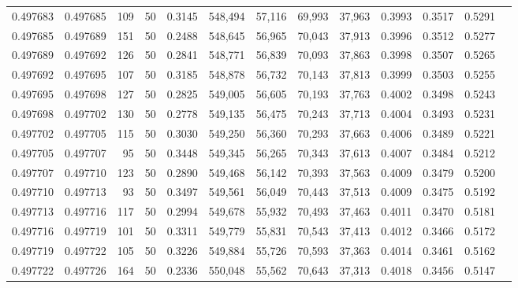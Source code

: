 \begin{tabular}{rrrrrrrrrrrrr}
0.497683 & 0.497685 &   109 &  50 &                                     0.3145 & 548,494 &  57,116 &  69,993 &  37,963 & 0.3993 & 0.3517 & 0.5291 \\
0.497685 & 0.497689 &   151 &  50 &                                     0.2488 & 548,645 &  56,965 &  70,043 &  37,913 & 0.3996 & 0.3512 & 0.5277 \\
0.497689 & 0.497692 &   126 &  50 &                                     0.2841 & 548,771 &  56,839 &  70,093 &  37,863 & 0.3998 & 0.3507 & 0.5265 \\
0.497692 & 0.497695 &   107 &  50 &                                     0.3185 & 548,878 &  56,732 &  70,143 &  37,813 & 0.3999 & 0.3503 & 0.5255 \\
0.497695 & 0.497698 &   127 &  50 &                                     0.2825 & 549,005 &  56,605 &  70,193 &  37,763 & 0.4002 & 0.3498 & 0.5243 \\
0.497698 & 0.497702 &   130 &  50 &                                     0.2778 & 549,135 &  56,475 &  70,243 &  37,713 & 0.4004 & 0.3493 & 0.5231 \\
0.497702 & 0.497705 &   115 &  50 &                                     0.3030 & 549,250 &  56,360 &  70,293 &  37,663 & 0.4006 & 0.3489 & 0.5221 \\
0.497705 & 0.497707 &    95 &  50 &                                     0.3448 & 549,345 &  56,265 &  70,343 &  37,613 & 0.4007 & 0.3484 & 0.5212 \\
0.497707 & 0.497710 &   123 &  50 &                                     0.2890 & 549,468 &  56,142 &  70,393 &  37,563 & 0.4009 & 0.3479 & 0.5200 \\
0.497710 & 0.497713 &    93 &  50 &                                     0.3497 & 549,561 &  56,049 &  70,443 &  37,513 & 0.4009 & 0.3475 & 0.5192 \\
0.497713 & 0.497716 &   117 &  50 &                                     0.2994 & 549,678 &  55,932 &  70,493 &  37,463 & 0.4011 & 0.3470 & 0.5181 \\
0.497716 & 0.497719 &   101 &  50 &                                     0.3311 & 549,779 &  55,831 &  70,543 &  37,413 & 0.4012 & 0.3466 & 0.5172 \\
0.497719 & 0.497722 &   105 &  50 &                                     0.3226 & 549,884 &  55,726 &  70,593 &  37,363 & 0.4014 & 0.3461 & 0.5162 \\
0.497722 & 0.497726 &   164 &  50 &                                     0.2336 & 550,048 &  55,562 &  70,643 &  37,313 & 0.4018 & 0.3456 & 0.5147 \\

\end{tabular}
